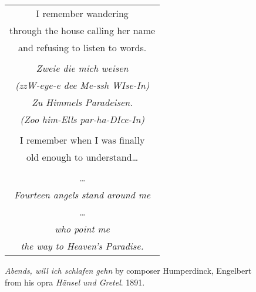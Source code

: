 \documentclass{article}
\begin{document}
\begin{center}
\begin{tabular}{c}
\\
I remember wandering \\
through the house calling her name \\
and refusing to listen to words. \\
\\
\textit{Zweie die mich weisen} \\
{\scriptsize\textit{(zzW-eye-e dee Me-ssh WIse-In)}} \\
\textit{Zu Himmels Paradeisen.} \\
{\scriptsize\textit{(Zoo him-Ells par-ha-DIce-In)}} \\
\\
I remember when I was finally \\
old enough to understand\ldots{} \\
\\
\ldots{} \\
\textit{Fourteen angels stand around me} \\
\ldots{} \\
\textit{who point me} \\
\textit{the way to Heaven's Paradise.}
\\
\end{tabular}
\end{center}
\vspace{3ex}
\textit{Abends, will ich schlafen gehn} by composer Humperdinck, Engelbert \\
from his opra \textit{H{\"a}nsel und Gretel}. 1891.
\end{document}
